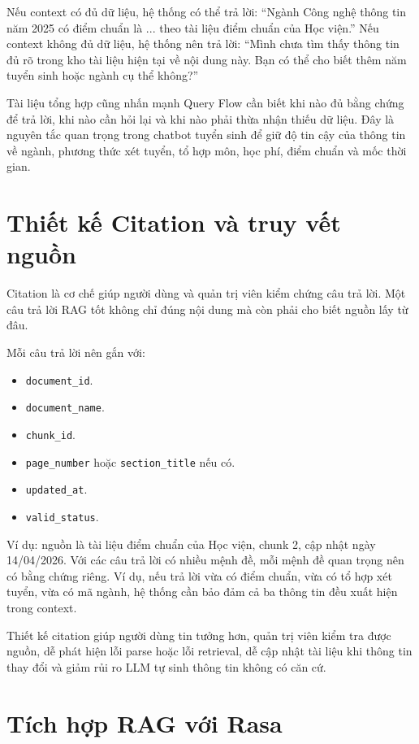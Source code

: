 \documentclass[12pt,a4paper]{report}
\begin{document}
Nếu context có đủ dữ liệu, hệ thống có thể trả lời: ``Ngành Công nghệ thông tin năm 2025 có điểm chuẩn là ... theo tài liệu điểm chuẩn của Học viện.'' Nếu context không đủ dữ liệu, hệ thống nên trả lời: ``Mình chưa tìm thấy thông tin đủ rõ trong kho tài liệu hiện tại về nội dung này. Bạn có thể cho biết thêm năm tuyển sinh hoặc ngành cụ thể không?''

Tài liệu tổng hợp cũng nhấn mạnh Query Flow cần biết khi nào đủ bằng chứng để trả lời, khi nào cần hỏi lại và khi nào phải thừa nhận thiếu dữ liệu. Đây là nguyên tắc quan trọng trong chatbot tuyển sinh để giữ độ tin cậy của thông tin về ngành, phương thức xét tuyển, tổ hợp môn, học phí, điểm chuẩn và mốc thời gian.

\section{Thiết kế Citation và truy vết nguồn}

Citation là cơ chế giúp người dùng và quản trị viên kiểm chứng câu trả lời. Một câu trả lời RAG tốt không chỉ đúng nội dung mà còn phải cho biết nguồn lấy từ đâu.

Mỗi câu trả lời nên gắn với:

\begin{itemize}
    \item \texttt{document\_id}.
    \item \texttt{document\_name}.
    \item \texttt{chunk\_id}.
    \item \texttt{page\_number} hoặc \texttt{section\_title} nếu có.
    \item \texttt{updated\_at}.
    \item \texttt{valid\_status}.
\end{itemize}

Ví dụ: nguồn là tài liệu điểm chuẩn của Học viện, chunk 2, cập nhật ngày 14/04/2026. Với các câu trả lời có nhiều mệnh đề, mỗi mệnh đề quan trọng nên có bằng chứng riêng. Ví dụ, nếu trả lời vừa có điểm chuẩn, vừa có tổ hợp xét tuyển, vừa có mã ngành, hệ thống cần bảo đảm cả ba thông tin đều xuất hiện trong context.

Thiết kế citation giúp người dùng tin tưởng hơn, quản trị viên kiểm tra được nguồn, dễ phát hiện lỗi parse hoặc lỗi retrieval, dễ cập nhật tài liệu khi thông tin thay đổi và giảm rủi ro LLM tự sinh thông tin không có căn cứ.

\section{Tích hợp RAG với Rasa}
\end{document}
